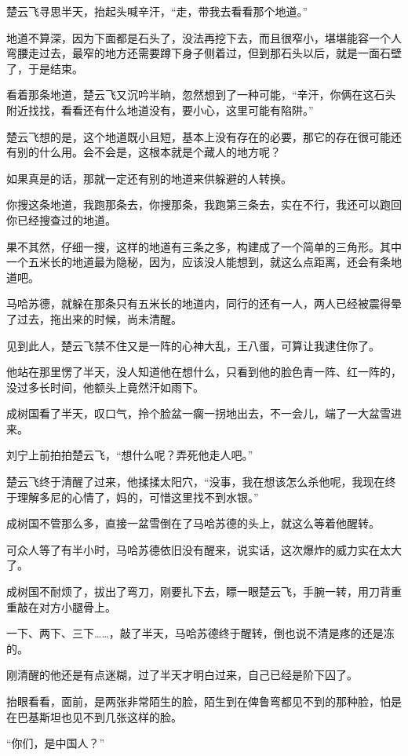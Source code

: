 楚云飞寻思半天，抬起头喊辛汗，“走，带我去看看那个地道。”

地道不算深，因为下面都是石头了，没法再挖下去，而且很窄小，堪堪能容一个人弯腰走过去，最窄的地方还需要蹲下身子侧着过，但到那石头以后，就是一面石壁了，于是结束。

看着那条地道，楚云飞又沉吟半晌，忽然想到了一种可能，“辛汗，你俩在这石头附近找找，看看还有什么地道没有，要小心，这里可能有陷阱。”

楚云飞想的是，这个地道既小且短，基本上没有存在的必要，那它的存在很可能还有别的什么用。会不会是，这根本就是个藏人的地方呢？

如果真是的话，那就一定还有别的地道来供躲避的人转换。

你搜这条地道，我跑那条去，你搜那条，我跑第三条去，实在不行，我还可以跑回你已经搜查过的地道。

果不其然，仔细一搜，这样的地道有三条之多，构建成了一个简单的三角形。其中一个五米长的地道最为隐秘，因为，应该没人能想到，就这么点距离，还会有条地道吧。

马哈苏德，就躲在那条只有五米长的地道内，同行的还有一人，两人已经被震得晕了过去，拖出来的时候，尚未清醒。

见到此人，楚云飞禁不住又是一阵的心神大乱，王八蛋，可算让我逮住你了。

他站在那里愣了半天，没人知道他在想什么，只看到他的脸色青一阵、红一阵的，没过多长时间，他额头上竟然汗如雨下。

成树国看了半天，叹口气，拎个脸盆一瘸一拐地出去，不一会儿，端了一大盆雪进来。

刘宁上前拍拍楚云飞，“想什么呢？弄死他走人吧。”

楚云飞终于清醒了过来，他揉揉太阳穴，“没事，我在想该怎么杀他呢，我现在终于理解多尼的心情了，妈的，可惜这里找不到水银。”

成树国不管那么多，直接一盆雪倒在了马哈苏德的头上，就这么等着他醒转。

可众人等了有半小时，马哈苏德依旧没有醒来，说实话，这次爆炸的威力实在太大了。

成树国不耐烦了，拔出了弯刀，刚要扎下去，瞟一眼楚云飞，手腕一转，用刀背重重敲在对方小腿骨上。

一下、两下、三下……，敲了半天，马哈苏德终于醒转，倒也说不清是疼的还是冻的。

刚清醒的他还是有点迷糊，过了半天才明白过来，自己已经是阶下囚了。

抬眼看看，面前，是两张非常陌生的脸，陌生到在俾鲁弯都见不到的那种脸，怕是在巴基斯坦也见不到几张这样的脸。

“你们，是中国人？”

